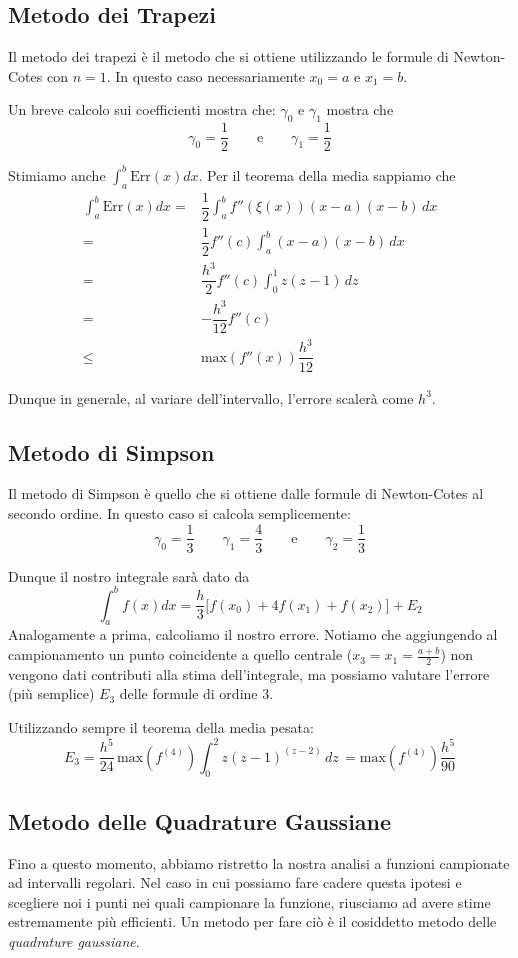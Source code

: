 \documentclass[a4paper,10pt]{article}
\begin{document}
\subsection{Metodo dei Trapezi}
Il metodo dei trapezi è il metodo che si ottiene utilizzando le formule di Newton-Cotes con $n=1$. In questo caso necessariamente $x_0 = a$ e $x_1 = b$.

Un breve calcolo sui coefficienti mostra che:
$\gamma_0$ e $\gamma_1$ mostra che $$\gamma_0 = \dfrac{1}{2}\qquad \text{e}\qquad \gamma_1 = \dfrac{1}{2}$$

Stimiamo anche $\int_a^b \text{Err}(x)dx$.
Per il teorema della media sappiamo che
\begin{eqnarray}
\int_a^b\text{Err}(x)dx =& \dfrac{1}{2}\displaystyle\int_a^bf''(\xi(x))(x-a)(x-b)\,dx \\
=& \dfrac{1}{2}f''(c)\displaystyle\int_a^b(x-a)(x-b)\,dx \\
=& \dfrac{h^3}{2}f''(c)\displaystyle\int_0^1z(z-1)\,dz \\
=& -\dfrac{h^3}{12}f''(c) \\ \leq& \text{max}(f''(x))\dfrac{h^3}{12}
\end{eqnarray}

Dunque in generale, al variare dell'intervallo, l'errore scalerà come $h^3$.

\subsection{Metodo di Simpson}
Il metodo di Simpson è quello che si ottiene dalle formule di Newton-Cotes al secondo ordine.
In questo caso si calcola semplicemente:
$$\gamma_0 = \dfrac{1}{3}\qquad \gamma_1 = \dfrac{4}{3}\qquad \text{e}\qquad \gamma_2 = \dfrac{1}{3}$$

Dunque il nostro integrale sarà dato da
$$\int_a^bf(x)dx = \frac{h}{3} \big[f(x_0)+4f(x_1)+f(x_2)\big] + E_2$$
Analogamente a prima, calcoliamo il nostro errore. Notiamo che aggiungendo al campionamento un punto coincidente a quello centrale ($x_3=x_1 = \frac{a+b}{2}$) non vengono dati contributi alla stima dell'integrale, ma possiamo valutare l'errore (più semplice) $E_3$ delle formule di ordine 3.

Utilizzando sempre il teorema della media pesata:
$$E_3=\frac{h^5}{24}\,\text{max}(f^{(4)})\int_0^2z(z-1)^(z-2)\,dz\, = \text{max}(f^{(4)})\frac{h^5}{90}$$

\subsection{Metodo delle Quadrature Gaussiane}
Fino a questo momento, abbiamo ristretto la nostra analisi a funzioni campionate ad intervalli regolari. Nel caso in cui possiamo fare cadere questa ipotesi e scegliere noi i punti nei quali campionare la funzione, riusciamo ad avere stime estremamente più efficienti. Un metodo per fare ciò è il cosiddetto metodo delle \emph{quadrature gaussiane}.
\end{document}
